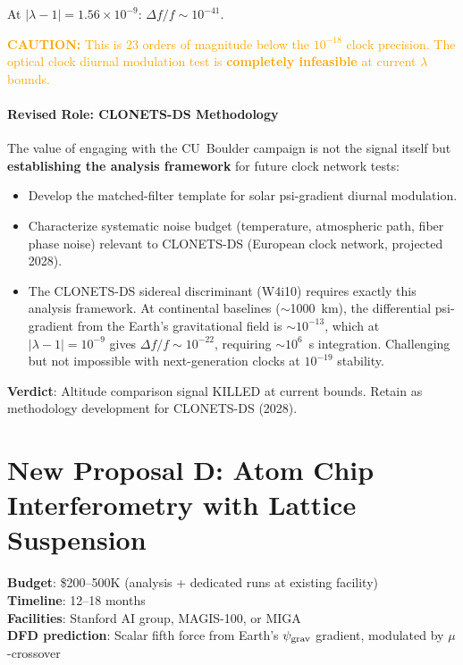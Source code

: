 \documentclass[11pt]{article}
\newcommand{\ee}[1]{\times 10^{#1}}
\newcommand{\lbone}{|\lambda - 1|}
\newcommand{\caution}[1]{\textcolor{orange}{\textbf{CAUTION:} #1}}
\begin{document}
At $\lbone = 1.56\ee{-9}$: $\Delta f/f \sim 10^{-41}$.

\caution{This is 23 orders of magnitude below the $10^{-18}$
clock precision. The optical clock diurnal modulation test is
\textbf{completely infeasible} at current $\lambda$ bounds.}

\subsection{Revised Role: CLONETS-DS Methodology}

The value of engaging with the CU~Boulder campaign is not the signal
itself but \textbf{establishing the analysis framework} for future
clock network tests:
\begin{itemize}[nosep]
\item Develop the matched-filter template for solar psi-gradient
  diurnal modulation.
\item Characterize systematic noise budget (temperature, atmospheric
  path, fiber phase noise) relevant to CLONETS-DS (European clock
  network, projected 2028).
\item The CLONETS-DS sidereal discriminant (W4i10) requires exactly
  this analysis framework. At continental baselines ($\sim$1000~km),
  the differential psi-gradient from the Earth's gravitational field
  is $\sim 10^{-13}$, which at $\lbone = 10^{-9}$ gives
  $\Delta f/f \sim 10^{-22}$, requiring $\sim 10^6$~s integration.
  Challenging but not impossible with next-generation clocks at
  $10^{-19}$ stability.
\end{itemize}

\textbf{Verdict}: Altitude comparison signal KILLED at current bounds.
Retain as methodology development for CLONETS-DS (2028).


\part{New Proposal D: Atom Chip Interferometry with Lattice Suspension}
\label{part:atom}

\begin{tcolorbox}[colback=purple!3!white, colframe=newcolor,
  title=\textbf{NEW PROPOSAL D --- ATOM INTERFEROMETRY SCALAR SEARCH}]
\textbf{Budget}: \$200--500K (analysis + dedicated runs at existing facility)\\
\textbf{Timeline}: 12--18 months\\
\textbf{Facilities}: Stanford AI group, MAGIS-100, or MIGA\\
\textbf{DFD prediction}: Scalar fifth force from Earth's $\psi_{\rm grav}$
gradient, modulated by $\mu$-crossover
\end{tcolorbox}
\end{document}
